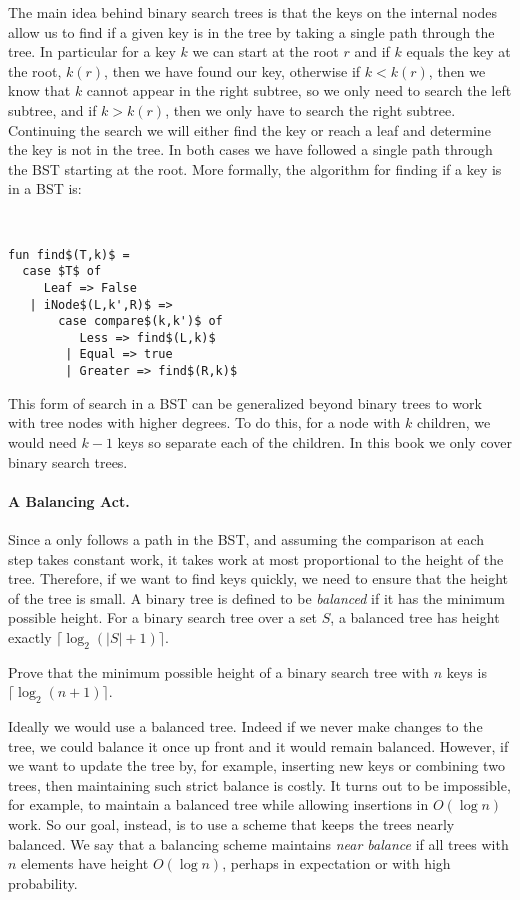 The main idea behind binary search trees is that the keys on the
internal nodes allow us to find if a given key is in the tree  by
taking a single path through the tree.  In particular for a key $k$ we
can start at the root $r$ and if $k$ equals the key at the root,
$k(r)$, then we have found our key, otherwise if $k < k(r)$, then we
know that $k$ cannot appear in the right subtree, so we only need to
search the left subtree, and if $k > k(r)$, then we only have to
search the right subtree.  Continuing the search we will either find
the key or reach a leaf and determine the key is not in the tree.  In
both cases we have followed a single path through the BST starting at
the root.     More formally, the algorithm for finding if a key is in 
a BST is:

\begin{algorithm}~
\begin{lstlisting}[numbers=none]
fun find$(T,k)$ =
  case $T$ of 
     Leaf => False
   | iNode$(L,k',R)$ => 
       case compare$(k,k')$ of
          Less => find$(L,k)$
        | Equal => true
        | Greater => find$(R,k)$
\end{lstlisting}
\end{algorithm}

This form of search in a BST can be generalized beyond binary trees to work with tree
nodes with higher degrees.  To do this, for a node with $k$ children,
we would need $k-1$ keys so separate each of the children.  In this
book we only cover binary search trees.

\paragraph{A Balancing Act.}
Since a  only follows a path in the BST, and assuming the
comparison at each step takes constant work, it takes work at most
proportional to the height of the tree.  Therefore, if we want to find
keys quickly, we need to ensure that the height of the tree is small.
A binary tree is defined to be \emph{balanced} if it has the minimum
possible height.  For a binary search tree over a set $S$, a balanced
tree has height exactly $\lceil \log_2 (|S| + 1) \rceil$.
\begin{exercise}
Prove that the minimum possible height of a binary search tree
with $n$ keys is $\lceil \log_2 (n + 1)\rceil$.
\end{exercise}
Ideally we would use a balanced tree.  Indeed if we never make changes
to 
the tree, we could balance it once up front and it would
remain balanced.  However, if we want to update the tree by, for
example, inserting new keys or combining two trees, then maintaining
such strict balance is costly.  It turns out to be impossible, for example, to
maintain a balanced tree while allowing insertions in $O(\log n)$ work.
So our goal, instead, is to use a scheme that keeps the trees nearly
balanced.  We say that a balancing scheme maintains \emph{near
  balance} if all trees with $n$ elements have height $O(\log n)$,
perhaps in expectation or with high probability.

